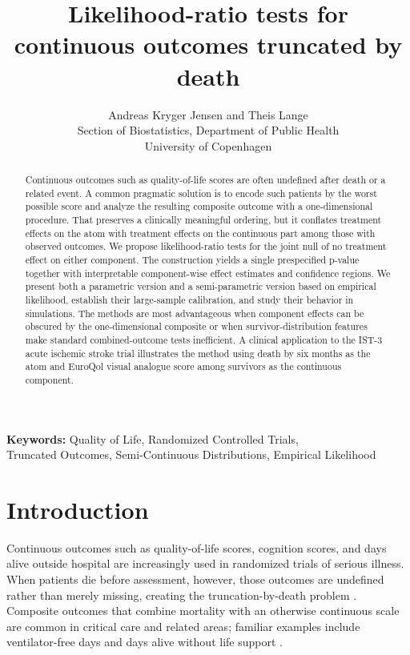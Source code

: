 \documentclass[11pt]{article}
\title{Likelihood-ratio tests for continuous outcomes truncated by death}
\author{
  Andreas Kryger Jensen and Theis Lange\\
  Section of Biostatistics, Department of Public Health\\
  University of Copenhagen
}
\date{}
\begin{document}
\maketitle

\begin{abstract}
Continuous outcomes such as quality-of-life scores are often undefined after death or a related event. A common pragmatic solution is to encode such patients by the worst possible score and analyze the resulting composite outcome with a one-dimensional procedure. That preserves a clinically meaningful ordering, but it conflates treatment effects on the atom with treatment effects on the continuous part among those with observed outcomes. We propose likelihood-ratio tests for the joint null of no treatment effect on either component. The construction yields a single prespecified p-value together with interpretable component-wise effect estimates and confidence regions. We present both a parametric version and a semi-parametric version based on empirical likelihood, establish their large-sample calibration, and study their behavior in simulations. The methods are most advantageous when component effects can be obscured by the one-dimensional composite or when survivor-distribution features make standard combined-outcome tests inefficient. A clinical application to the IST-3 acute ischemic stroke trial illustrates the method using death by six months as the atom and EuroQol visual analogue score among survivors as the continuous component.
\end{abstract}

\begin{center}
\textbf{Keywords:} Quality of Life, Randomized Controlled Trials,\\
Truncated Outcomes, Semi-Continuous Distributions, Empirical Likelihood
\end{center}

\section{Introduction}

Continuous outcomes such as quality-of-life scores, cognition scores, and days alive outside hospital are increasingly used in randomized trials of serious illness. When patients die before assessment, however, those outcomes are undefined rather than merely missing, creating the truncation-by-death problem \citep{Frangakis_2002,Colantuoni_2018}. Composite outcomes that combine mortality with an otherwise continuous scale are common in critical care and related areas; familiar examples include ventilator-free days and days alive without life support \citep{10.1001/jama.2021.18295,Yehya_2019}.
\end{document}
